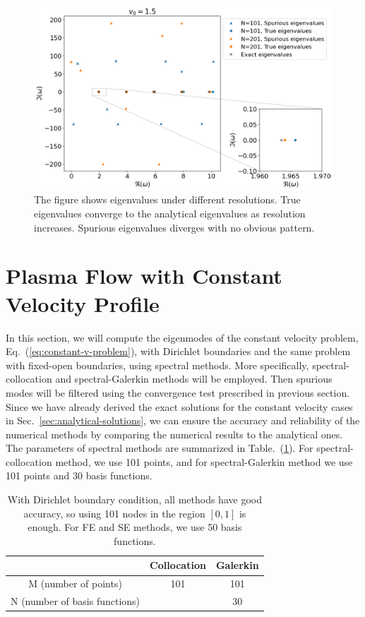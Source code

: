 \begin{figure} [htbp]
	\centering
	\includegraphics[width=\textwidth]{figures/convergence-test.png}
	\caption{The figure shows eigenvalues under different resolutions. True eigenvalues converge to the analytical eigenvalues as resolution increases. Spurious eigenvalues diverges with no obvious pattern.}
	\label{fig:convergence-test}
\end{figure}

\section{Plasma Flow with Constant Velocity Profile}
In this section, we will compute the eigenmodes of the constant velocity problem, Eq.~(\ref{eq:constant-v-problem}), with Dirichlet boundaries and the same problem with fixed-open boundaries, using spectral methods. More specifically, spectral-collocation and spectral-Galerkin methods will be employed. Then spurious modes will be filtered using the convergence test prescribed in previous section. Since we have already derived the exact solutions for the constant velocity cases in Sec.~\ref{sec:analytical-solutions}, we can ensure the accuracy and reliability of the numerical methods by comparing the numerical results to the analytical ones. The parameters of spectral methods are summarized in Table.~(\ref{table:parameters}). For spectral-collocation method, we use 101 points, and for spectral-Galerkin method we use 101 points and 30 basis functions.

\begin{table} [htbp]
	\centering
	\caption{With Dirichlet boundary condition, all methods have good accuracy, so using 101 nodes in the region $[0,1]$ is enough. For FE and SE methods, we use 50 basis functions.}
	\begin{tabular}{|c|c|c|}
		\hline
		                              & Collocation & Galerkin \\
		\hline
		M (number of points)          & 101         & 101      \\
		\hline
		N (number of basis functions) &             & 30       \\
		\hline
	\end{tabular}
	\label{table:parameters}
\end{table}


